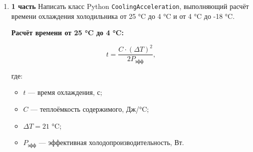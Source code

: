 \begin{enumerate}
\textbf{2 часть}

На основе программного кода предыдущего практикума текущего курса ООП выполнить наследование класса \texttt{CookingAcceleration} с использованием \texttt{super()} таким образом, чтобы через класс с множественным наследованием \texttt{CookingAppliance} вывести на печать время нагрева и приготовления для трёх типов приборов при следующих параметрах:

\begin{itemize}
    \item Microwave — $C = 120$ Дж/°C, $P = 1000$ Вт;  
    \item Oven — $C = 450$ Дж/°C, $P = 2500$ Вт;  
    \item AirFryer — $C = 200$ Дж/°C, $P = 1500$ Вт.  
\end{itemize}

\textbf{3 часть}

На основе программного кода и параметров приборов из 2 части текущего практикума отобразить через класс с множественным наследованием \texttt{CookingAppliance} расчёт времени приготовления от 150 °C до 250 °C через каждые 25 °C, учитывая, что коэффициент мощности $k = 0{,}62$ увеличивается через каждые 25 °C на 0{,}08.

\textbf{Коэффициенты мощности для различных диапазонов температур:}
\begin{itemize}
    \item 150–175 °C: $k = 0{,}62$;  
    \item 175–200 °C: $k = 0{,}70$;  
    \item 200–225 °C: $k = 0{,}78$;  
    \item 225–250 °C: $k = 0{,}86$.  
\end{itemize}


\item[25] \textbf{1 часть}  
Написать класс Python \texttt{CoolingAcceleration}, выполняющий расчёт времени охлаждения холодильника от 25 °C до 4 °C и от 4 °C до -18 °C.

\textbf{Расчёт времени от 25 °C до 4 °C:}

\begin{equation}
t = \frac{C \cdot (\Delta T)^2}{2P_{\text{эфф}}},
\end{equation}

где:  
\begin{itemize}
    \item $t$ — время охлаждения, с;  
    \item $C$ — теплоёмкость содержимого, Дж/°C;  
    \item $\Delta T = 21$ °C;  
    \item $P_{\text{эфф}}$ — эффективная холодопроизводительность, Вт.  
\end{itemize}


\end{enumerate}

